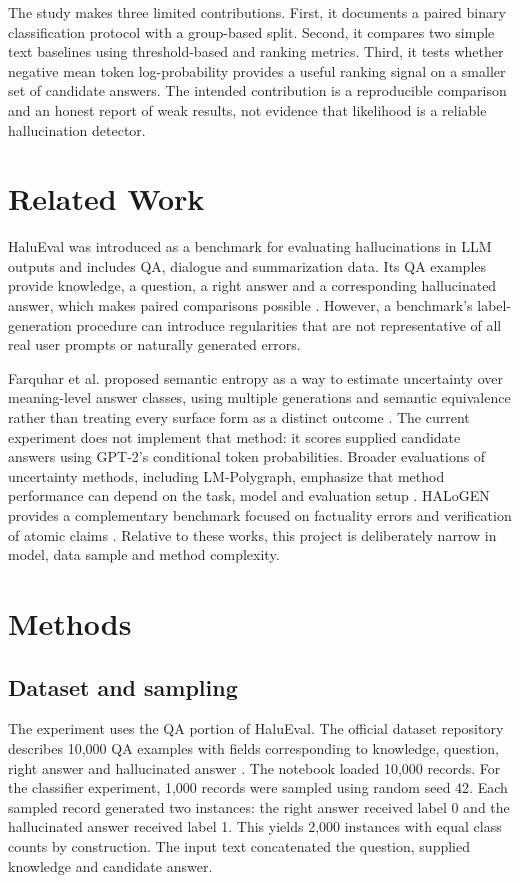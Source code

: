 \documentclass[acmsmall,nonacm]{acmart}
\begin{document}
The study makes three limited contributions. First, it documents a paired binary classification protocol with a group-based split. Second, it compares two simple text baselines using threshold-based and ranking metrics. Third, it tests whether negative mean token log-probability provides a useful ranking signal on a smaller set of candidate answers. The intended contribution is a reproducible comparison and an honest report of weak results, not evidence that likelihood is a reliable hallucination detector.

\section{Related Work}
HaluEval was introduced as a benchmark for evaluating hallucinations in LLM outputs and includes QA, dialogue and summarization data. Its QA examples provide knowledge, a question, a right answer and a corresponding hallucinated answer, which makes paired comparisons possible \citep{li2023halueval}. However, a benchmark's label-generation procedure can introduce regularities that are not representative of all real user prompts or naturally generated errors.

Farquhar et al. proposed semantic entropy as a way to estimate uncertainty over meaning-level answer classes, using multiple generations and semantic equivalence rather than treating every surface form as a distinct outcome \citep{farquhar2024semantic}. The current experiment does not implement that method: it scores supplied candidate answers using GPT-2's conditional token probabilities. Broader evaluations of uncertainty methods, including LM-Polygraph, emphasize that method performance can depend on the task, model and evaluation setup \citep{vashurin2025polygraph}. HALoGEN provides a complementary benchmark focused on factuality errors and verification of atomic claims \citep{ravichander2025halogen}. Relative to these works, this project is deliberately narrow in model, data sample and method complexity.

\section{Methods}
\subsection{Dataset and sampling}
The experiment uses the QA portion of HaluEval. The official dataset repository describes 10,000 QA examples with fields corresponding to knowledge, question, right answer and hallucinated answer \citep{rucaiboxhalueval}. The notebook loaded 10,000 records. For the classifier experiment, 1,000 records were sampled using random seed 42. Each sampled record generated two instances: the right answer received label 0 and the hallucinated answer received label 1. This yields 2,000 instances with equal class counts by construction. The input text concatenated the question, supplied knowledge and candidate answer.
\end{document}
